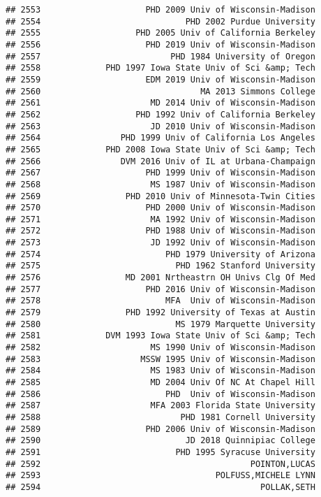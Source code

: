 \documentclass[
]{article}
\begin{document}
\begin{verbatim}
## 2553                     PHD 2009 Univ of Wisconsin-Madison
## 2554                             PHD 2002 Purdue University
## 2555                   PHD 2005 Univ of California Berkeley
## 2556                     PHD 2019 Univ of Wisconsin-Madison
## 2557                          PHD 1984 University of Oregon
## 2558             PHD 1997 Iowa State Univ of Sci &amp; Tech
## 2559                     EDM 2019 Univ of Wisconsin-Madison
## 2560                                MA 2013 Simmons College
## 2561                      MD 2014 Univ of Wisconsin-Madison
## 2562                   PHD 1992 Univ of California Berkeley
## 2563                      JD 2010 Univ of Wisconsin-Madison
## 2564                PHD 1999 Univ of California Los Angeles
## 2565             PHD 2008 Iowa State Univ of Sci &amp; Tech
## 2566                DVM 2016 Univ of IL at Urbana-Champaign
## 2567                     PHD 1999 Univ of Wisconsin-Madison
## 2568                      MS 1987 Univ of Wisconsin-Madison
## 2569                 PHD 2010 Univ of Minnesota-Twin Cities
## 2570                     PHD 2000 Univ of Wisconsin-Madison
## 2571                      MA 1992 Univ of Wisconsin-Madison
## 2572                     PHD 1988 Univ of Wisconsin-Madison
## 2573                      JD 1992 Univ of Wisconsin-Madison
## 2574                         PHD 1979 University of Arizona
## 2575                           PHD 1962 Stanford University
## 2576                 MD 2001 Nrtheastrn OH Univs Clg Of Med
## 2577                     PHD 2016 Univ of Wisconsin-Madison
## 2578                         MFA  Univ of Wisconsin-Madison
## 2579                 PHD 1992 University of Texas at Austin
## 2580                           MS 1979 Marquette University
## 2581             DVM 1993 Iowa State Univ of Sci &amp; Tech
## 2582                      MS 1990 Univ of Wisconsin-Madison
## 2583                    MSSW 1995 Univ of Wisconsin-Madison
## 2584                      MS 1983 Univ of Wisconsin-Madison
## 2585                      MD 2004 Univ Of NC At Chapel Hill
## 2586                         PHD  Univ of Wisconsin-Madison
## 2587                      MFA 2003 Florida State University
## 2588                            PHD 1981 Cornell University
## 2589                     PHD 2006 Univ of Wisconsin-Madison
## 2590                             JD 2018 Quinnipiac College
## 2591                           PHD 1995 Syracuse University
## 2592                                          POINTON,LUCAS
## 2593                                   POLFUSS,MICHELE LYNN
## 2594                                            POLLAK,SETH

\end{verbatim}
\end{document}
